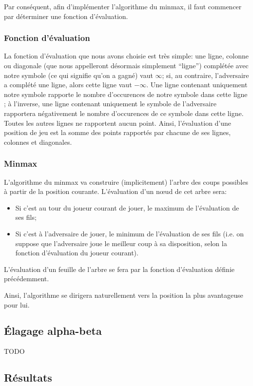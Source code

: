 Par conséquent, afin d'implémenter l'algorithme du minmax, il faut
commencer par déterminer une fonction d'évaluation.

\subsubsection{Fonction d'évaluation}
La fonction d'évaluation que nous avons choisie est très simple: une
ligne, colonne ou diagonale (que nous appelleront désormais simplement
``ligne'') complétée avec notre symbole (ce qui signifie qu'on a
gagné) vaut $\infty$; si, au contraire, l'adversaire a complété une
ligne, alors cette ligne vaut $-\infty$. Une ligne contenant
uniquement notre symbole rapporte le nombre d'occurences de notre
symbole dans cette ligne ; à l'inverse, une ligne contenant uniquement
le symbole de l'adversaire rapportera négativement le nombre
d'occurences de ce symbole dans cette ligne.
Toutes les autres lignes ne rapportent aucun point.
Ainsi, l'évaluation d'une position de jeu est la somme des points
rapportés par chacune de ses lignes, colonnes et diagonales.

\subsubsection{Minmax}
L'algorithme du minmax va construire (implicitement) l'arbre des coups
possibles à partir de la position courante.
L'évaluation d'un n\oe ud de cet arbre sera:
\begin{itemize}
  \item Si c'est au tour du joueur courant de jouer, le maximum de
    l'évaluation de ses fils;
  \item Si c'est à l'adversaire de jouer, le minimum de l'évaluation
    de ses fils (i.e. on suppose que l'adversaire joue le meilleur
    coup à sa disposition, selon la fonction d'évaluation du joueur courant).
\end{itemize}
L'évaluation d'un feuille de l'arbre se fera par la fonction
d'évaluation définie précédemment.

Ainsi, l'algorithme se dirigera naturellement vers la position la plus
avantageuse pour lui.

\subsection{Élagage alpha-beta}
TODO

\subsection{Résultats}
